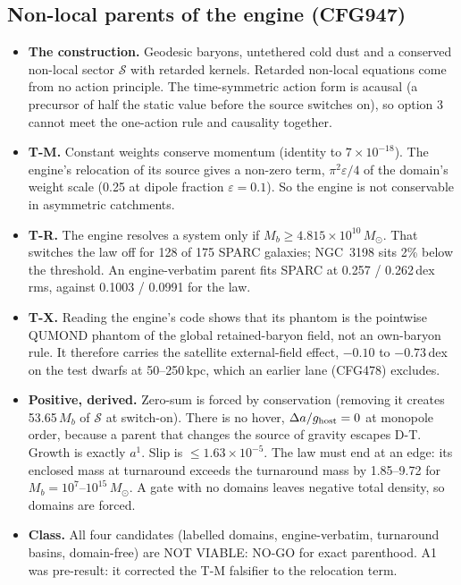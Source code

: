 \documentclass[10pt]{article}
\begin{document}
\subsection{Non-local parents of the engine (CFG947)}
\begin{itemize}
\item \textbf{The construction.} Geodesic baryons, untethered cold dust and a conserved non-local sector $\mathcal S$ with retarded kernels. Retarded non-local equations come from no action principle. The time-symmetric action form is acausal (a precursor of half the static value before the source switches on), so option 3 cannot meet the one-action rule and causality together.
\item \textbf{T-M.} Constant weights conserve momentum (identity to $7\times10^{-18}$). The engine's relocation of its source gives a non-zero term, $\pi^2\varepsilon/4$ of the domain's weight scale (0.25 at dipole fraction $\varepsilon=0.1$). So the engine is not conservable in asymmetric catchments.
\item \textbf{T-R.} The engine resolves a system only if $M_b\ge4.815\times10^{10}\,M_\odot$. That switches the law off for 128 of 175 SPARC galaxies; NGC~3198 sits 2\% below the threshold. An engine-verbatim parent fits SPARC at 0.257 / 0.262\,dex rms, against 0.1003 / 0.0991 for the law.
\item \textbf{T-X.} Reading the engine's code shows that its phantom is the pointwise QUMOND phantom of the global retained-baryon field, not an own-baryon rule. It therefore carries the satellite external-field effect, $-0.10$ to $-0.73$\,dex on the test dwarfs at 50--250\,kpc, which an earlier lane (CFG478) excludes.
\item \textbf{Positive, derived.} Zero-sum is forced by conservation (removing it creates 53.65\,$M_b$ of $\mathcal S$ at switch-on). There is no hover, $\Delta a/g_{\rm host}=0$ at monopole order, because a parent that changes the source of gravity escapes D-T. Growth is exactly $a^1$. Slip is $\le1.63\times10^{-5}$. The law must end at an edge: its enclosed mass at turnaround exceeds the turnaround mass by 1.85--9.72 for $M_b=10^7$--$10^{15}\,M_\odot$. A gate with no domains leaves negative total density, so domains are forced.
\item \textbf{Class.} All four candidates (labelled domains, engine-verbatim, turnaround basins, domain-free) are NOT VIABLE: NO-GO for exact parenthood. A1 was pre-result: it corrected the T-M falsifier to the relocation term.
\end{itemize}
\end{document}
